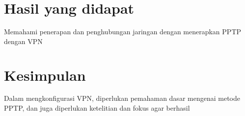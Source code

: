 \section{Hasil yang didapat}
Memahami penerapan dan penghubungan jaringan dengan menerapkan PPTP dengan VPN

\section{Kesimpulan}
Dalam mengkonfigurasi VPN, diperlukan pemahaman dasar mengenai metode PPTP, dan juga diperlukan ketelitian dan fokus agar berhasil
